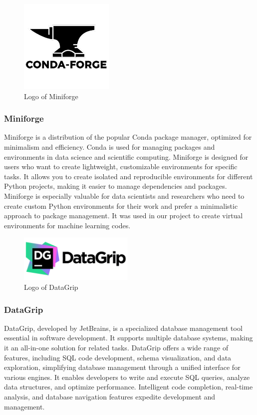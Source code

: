 \documentclass[conference]{IEEEtran}
\begin{document}
        \begin{figure}[htbp]
        \centerline{\includegraphics[width=4.5cm]{Images/logo/forge.png}}
        \label{fig}
        \caption{Logo of Miniforge}
        \end{figure}
        \subsubsection{Miniforge}
        Miniforge is a distribution of the popular Conda package manager, optimized for minimalism and efficiency. Conda is used for managing packages and environments in data science and scientific computing. Miniforge is designed for users who want to create lightweight, customizable environments for specific tasks. It allows you to create isolated and reproducible environments for different Python projects, making it easier to manage dependencies and packages. Miniforge is especially valuable for data scientists and researchers who need to create custom Python environments for their work and prefer a minimalistic approach to package management. It was used in our project to create virtual environments for machine learning codes.\\

        \begin{figure}[htbp]
        \centerline{\includegraphics[width=5.5cm]{Images/logo/datagrip.png}}
        \label{fig}
        \caption{Logo of DataGrip}
        \end{figure}
        \subsubsection{DataGrip}
        DataGrip, developed by JetBrains, is a specialized database management tool essential in software development. It supports multiple database systems, making it an all-in-one solution for related tasks. DataGrip offers a wide range of features, including SQL code development, schema visualization, and data exploration, simplifying database management through a unified interface for various engines. It enables developers to write and execute SQL queries, analyze data structures, and optimize performance. Intelligent code completion, real-time analysis, and database navigation features expedite development and management.\\
\end{document}
